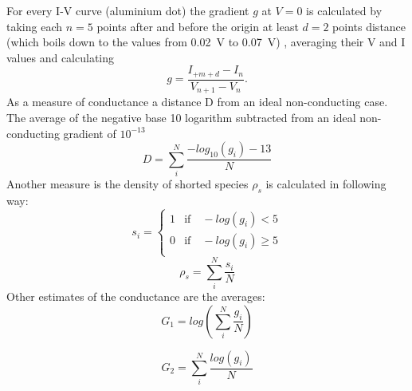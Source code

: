 For every I-V curve (aluminium dot) the gradient $g$ at $V=0$ is calculated by taking 
each $n=5$ points after and before the origin at least $d=2$ points distance (which boils
down to the values from \SI{0.02}{\volt} to \SI{0.07}{\volt}) , averaging their V and I values 
and calculating
\begin{equation}
    g = \frac{I_{+m+d} - I_n}{V_{n+1} - V_n}.
\end{equation}
As a measure of conductance a distance D from an ideal non-conducting case. The average of the negative base 10 logarithm subtracted from an ideal non-conducting gradient of $10^{-13}$ 
\begin{equation}
	D = \sum_i^N \frac{ -log_{10}(g_i) - 13}{N}
	\label{eq:D}
\end{equation}
Another measure is the density of shorted species $\rho_{s}$ is calculated in following way:
\begin{equation}
	s_i = \begin{cases}
	1 &\text{if} \quad -log(g_i) < 5 \\
	0 &\text{if} \quad -log(g_i) \geq 5 \\
	\end{cases}
\end{equation}
\begin{equation}
	\rho_s = \sum_i^N \frac{s_i}{N}
	\label{eq:rho}
\end{equation}
Other estimates of the conductance are the averages:
\begin{equation}
	G_1 = log \left( \sum_i^N \frac{g_i}{N} \right)
\end{equation}

\begin{equation}
	G_2 =  \sum_i^N \frac{log(g_i)}{N}
\end{equation}


